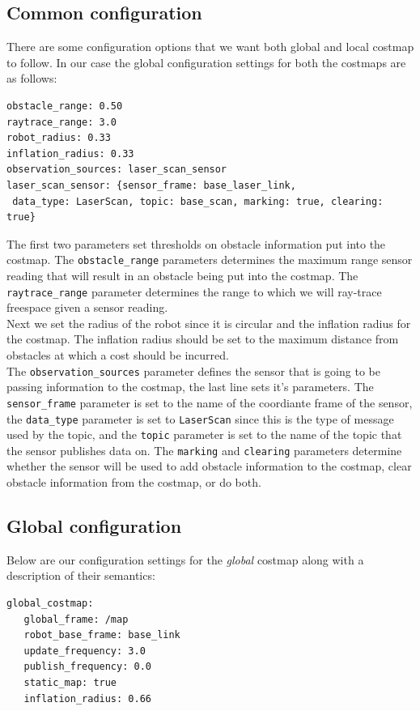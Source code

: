\subsection{Common configuration}
There are some configuration options that we want both global and local costmap 
to follow. In our case the global configuration settings for both the costmaps are 
as follows:
\begin{lstlisting}
obstacle_range: 0.50
raytrace_range: 3.0
robot_radius: 0.33
inflation_radius: 0.33
observation_sources: laser_scan_sensor
laser_scan_sensor: {sensor_frame: base_laser_link,
 data_type: LaserScan, topic: base_scan, marking: true, clearing: true}
\end{lstlisting}
The first two parameters set thresholds on obstacle information put into the 
costmap. The \texttt{obstacle\_range} parameters determines the maximum range sensor
reading that will result in an obstacle being put into the costmap.
The \texttt{raytrace\_range} parameter determines the range to which we will ray-trace 
freespace given a sensor reading.
\\
Next we set the radius of the robot since it is circular and the inflation radius 
for the costmap. The inflation radius should be set to the maximum distance 
from obstacles at which a cost should be incurred. 
\\
The \texttt{observation\_sources} parameter defines the sensor that is going to be passing 
information to the costmap, the last line sets it's parameters. The \texttt{sensor\_frame}
parameter is set to the name of the coordiante frame of the sensor, the \texttt{data\_type}
parameter is set to \texttt{LaserScan} since this is the type of message used by the topic,
and the \texttt{topic} parameter is set to the name of the topic that the sensor 
publishes data on. The \texttt{marking} and \texttt{clearing} parameters determine 
whether the sensor will be used to add obstacle information to the costmap, clear obstacle
information from the costmap, or do both.

\subsection{Global configuration}
Below are our configuration settings for the \textit{global} costmap along with a
description of their semantics:
\begin{lstlisting}
global_costmap:
   global_frame: /map
   robot_base_frame: base_link
   update_frequency: 3.0
   publish_frequency: 0.0
   static_map: true
   inflation_radius: 0.66
\end{lstlisting}

